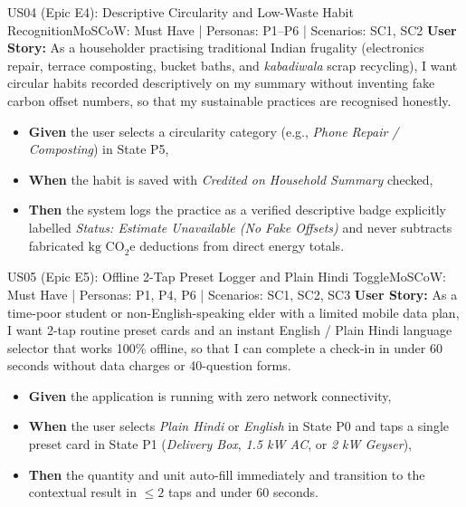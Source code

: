 \documentclass[12pt, a4paper]{article}
\begin{document}
\begin{storybox}{US04 (Epic E4): Descriptive Circularity and Low-Waste Habit Recognition}{MoSCoW: Must Have | Personas: P1--P6 | Scenarios: SC1, SC2}
\textbf{User Story:} As a householder practising traditional Indian frugality (electronics repair, terrace composting, bucket baths, and \textit{kabadiwala} scrap recycling), I want circular habits recorded descriptively on my summary without inventing fake carbon offset numbers, so that my sustainable practices are recognised honestly.
\begin{itemize}
    \item \textbf{Given} the user selects a circularity category (e.g., \textit{Phone Repair / Composting}) in State P5,
    \item \textbf{When} the habit is saved with \textit{Credited on Household Summary} checked,
    \item \textbf{Then} the system logs the practice as a verified descriptive badge explicitly labelled \textit{Status: Estimate Unavailable (No Fake Offsets)} and never subtracts fabricated $\text{kg CO}_2\text{e}$ deductions from direct energy totals.
\end{itemize}
\end{storybox}

\begin{storybox}{US05 (Epic E5): Offline 2-Tap Preset Logger and Plain Hindi Toggle}{MoSCoW: Must Have | Personas: P1, P4, P6 | Scenarios: SC1, SC2, SC3}
\textbf{User Story:} As a time-poor student or non-English-speaking elder with a limited mobile data plan, I want 2-tap routine preset cards and an instant English / Plain Hindi language selector that works 100\% offline, so that I can complete a check-in in under 60 seconds without data charges or 40-question forms.
\begin{itemize}
    \item \textbf{Given} the application is running with zero network connectivity,
    \item \textbf{When} the user selects \textit{Plain Hindi} or \textit{English} in State P0 and taps a single preset card in State P1 (\textit{Delivery Box}, \textit{1.5 kW AC}, or \textit{2 kW Geyser}),
    \item \textbf{Then} the quantity and unit auto-fill immediately and transition to the contextual result in $\le 2$ taps and under 60 seconds.
\end{itemize}
\end{storybox}
\end{document}
